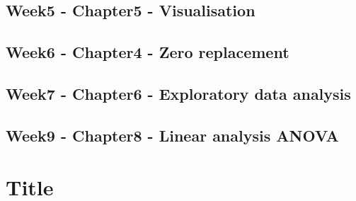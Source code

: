 \documentclass{article}
\begin{document}
 
\subsection{Week5 - Chapter5 - Visualisation} 
\subsection{Week6 - Chapter4 - Zero replacement} 
\subsection{Week7 - Chapter6 - Exploratory data analysis } 
\subsection{Week9 - Chapter8 - Linear analysis ANOVA} 


\section{Title}
\end{document}

